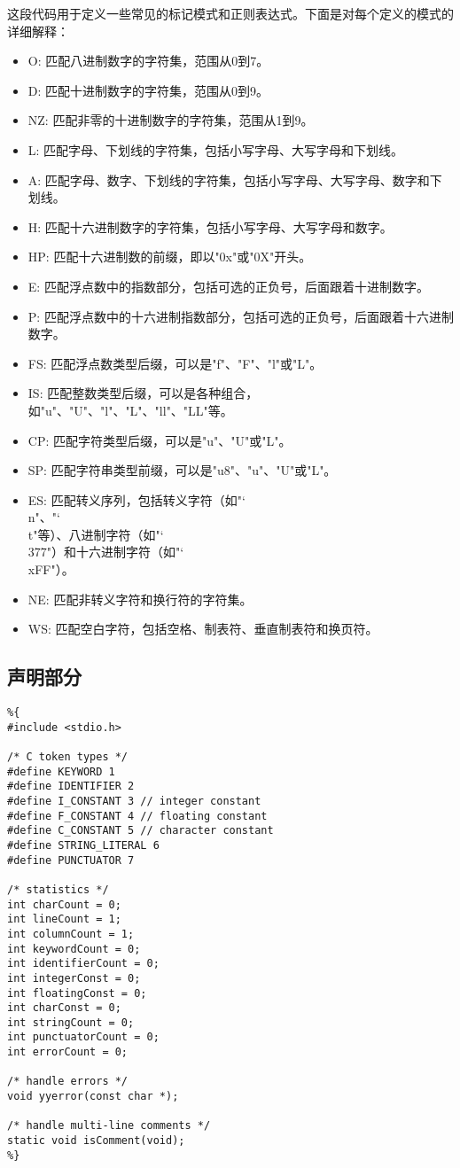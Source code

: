\documentclass[lang=cn,11pt,a4paper]{elegantpaper}
\begin{document}
这段代码用于定义一些常见的标记模式和正则表达式。下面是对每个定义的模式的详细解释：

\begin{itemize}
    \item O: 匹配八进制数字的字符集，范围从0到7。
    \item D: 匹配十进制数字的字符集，范围从0到9。
    \item NZ: 匹配非零的十进制数字的字符集，范围从1到9。
    \item L: 匹配字母、下划线的字符集，包括小写字母、大写字母和下划线。
    \item A: 匹配字母、数字、下划线的字符集，包括小写字母、大写字母、数字和下划线。
    \item H: 匹配十六进制数字的字符集，包括小写字母、大写字母和数字。
    \item HP: 匹配十六进制数的前缀，即以"0x"或"0X"开头。
    \item E: 匹配浮点数中的指数部分，包括可选的正负号，后面跟着十进制数字。
    \item P: 匹配浮点数中的十六进制指数部分，包括可选的正负号，后面跟着十六进制数字。
    \item FS: 匹配浮点数类型后缀，可以是"f"、"F"、"l"或"L"。
    \item IS: 匹配整数类型后缀，可以是各种组合，如"u"、"U"、"l"、"L"、"ll"、"LL"等。
    \item CP: 匹配字符类型后缀，可以是"u"、"U"或"L"。
    \item SP: 匹配字符串类型前缀，可以是"u8"、"u"、"U"或"L"。
    \item ES: 匹配转义序列，包括转义字符（如"\char`\\n"、"\char`\\t"等）、八进制字符（如"\char`\\377"）和十六进制字符（如"\char`\\xFF"）。
    \item NE: 匹配非转义字符和换行符的字符集。
    \item WS: 匹配空白字符，包括空格、制表符、垂直制表符和换页符。
\end{itemize}

\subsection{声明部分}

\begin{lstlisting}
%{
#include <stdio.h>

/* C token types */
#define KEYWORD 1
#define IDENTIFIER 2
#define I_CONSTANT 3 // integer constant
#define F_CONSTANT 4 // floating constant
#define C_CONSTANT 5 // character constant
#define STRING_LITERAL 6
#define PUNCTUATOR 7

/* statistics */
int charCount = 0;
int lineCount = 1;
int columnCount = 1;
int keywordCount = 0;
int identifierCount = 0;
int integerConst = 0;
int floatingConst = 0;
int charConst = 0;
int stringCount = 0;
int punctuatorCount = 0;
int errorCount = 0;

/* handle errors */
void yyerror(const char *);

/* handle multi-line comments */
static void isComment(void);
%}
\end{lstlisting}
\end{document}
